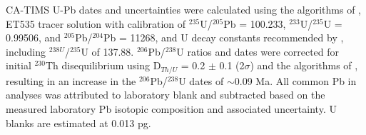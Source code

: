 \documentclass[11pt,letterpaper]{article}
\begin{document}
CA-TIMS U-Pb dates and uncertainties were calculated using the algorithms of \cite{Schmitz2007a}, ET535 tracer solution \cite{Condon2015a} with calibration of $^{235}$U/$^{205}$Pb = 100.233, $^{233}$U/$^{235}$U = 0.99506, and $^{205}$Pb/$^{204}$Pb = 11268, and U decay constants recommended by \cite{Jaffey1971a}, including $^{238U}$/$^{235}$U of 137.88. $^{206}$Pb/$^{238}$U ratios and dates were corrected for initial $^{230}$Th disequilibrium using D$_{Th/U}$ = 0.2 $\pm$ 0.1 (2$\sigma$) and the algorithms of \cite{Crowley2007a}, resulting in an increase in the $^{206}$Pb/$^{238}$U dates of $\sim$0.09 Ma. All common Pb in analyses was attributed to laboratory blank and subtracted based on the measured laboratory Pb isotopic composition and associated uncertainty. U blanks are estimated at 0.013 pg. 


\end{document}
